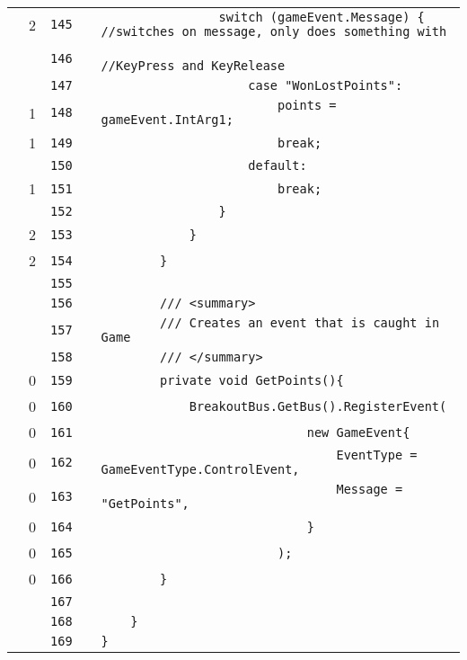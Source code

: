 \documentclass[a4paper,landscape,10pt]{article}
\begin{document}
\begin{longtable}[l]{lrrll}
\cellcolor{green} & 2 & \verb~145~ & & \verb~                switch (gameEvent.Message) { //switches on message, only does something with~\\
\cellcolor{gray} &  & \verb~146~ & & \verb~                                             //KeyPress and KeyRelease~\\
\cellcolor{gray} &  & \verb~147~ & & \verb~                    case "WonLostPoints":~\\
\cellcolor{green} & 1 & \verb~148~ & & \verb~                        points = gameEvent.IntArg1;~\\
\cellcolor{green} & 1 & \verb~149~ & & \verb~                        break;~\\
\cellcolor{gray} &  & \verb~150~ & & \verb~                    default:~\\
\cellcolor{green} & 1 & \verb~151~ & & \verb~                        break;~\\
\cellcolor{gray} &  & \verb~152~ & & \verb~                }~\\
\cellcolor{green} & 2 & \verb~153~ & & \verb~            }~\\
\cellcolor{green} & 2 & \verb~154~ & & \verb~        }~\\
\cellcolor{gray} &  & \verb~155~ & & \verb~~\\
\cellcolor{gray} &  & \verb~156~ & & \verb~        /// <summary>~\\
\cellcolor{gray} &  & \verb~157~ & & \verb~        /// Creates an event that is caught in Game~\\
\cellcolor{gray} &  & \verb~158~ & & \verb~        /// </summary>~\\
\cellcolor{red} & 0 & \verb~159~ & & \verb~        private void GetPoints(){~\\
\cellcolor{red} & 0 & \verb~160~ & & \verb~            BreakoutBus.GetBus().RegisterEvent(~\\
\cellcolor{red} & 0 & \verb~161~ & & \verb~                            new GameEvent{~\\
\cellcolor{red} & 0 & \verb~162~ & & \verb~                                EventType = GameEventType.ControlEvent,~\\
\cellcolor{red} & 0 & \verb~163~ & & \verb~                                Message = "GetPoints",~\\
\cellcolor{red} & 0 & \verb~164~ & & \verb~                            }~\\
\cellcolor{red} & 0 & \verb~165~ & & \verb~                        );~\\
\cellcolor{red} & 0 & \verb~166~ & & \verb~        }~\\
\cellcolor{gray} &  & \verb~167~ & & \verb~~\\
\cellcolor{gray} &  & \verb~168~ & & \verb~    }~\\
\cellcolor{gray} &  & \verb~169~ & & \verb~}~\\
\end{longtable}
\newpage
\end{document}
